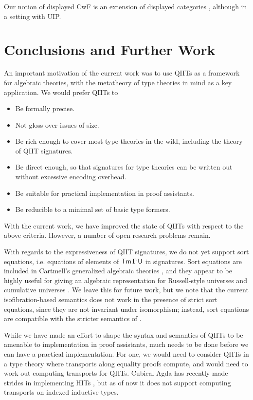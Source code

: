 \documentclass[sigplan,review,anonymous]{acmart}\settopmatter{printfolios=true,printccs=false,printacmref=false}
\begin{document}
Our notion of displayed CwF is an extension of displayed categories
\cite{displayedcats}, although in a setting with UIP.

\section{Conclusions and Further Work}
\label{sec:conclusion}

An important motivation of the current work was to use QIITs as a framework for
algebraic theories, with the metatheory of type theories in mind as a key
application. We would prefer QIITs to
\begin{itemize}
\item Be formally precise.
\item Not gloss over issues of size.
\item Be rich enough to cover most type theories in the wild, including the theory
      of QIIT signatures.
\item Be direct enough, so that signatures for type theories can
      be written out without excessive encoding overhead.
\item Be suitable for practical implementation in proof assistants.
\item Be reducible to a minimal set of basic type formers.
\end{itemize}

With the current work, we have improved the state of QIITs with respect to
the above criteria. However, a number of open research problems remain.

With regards to the expressiveness of QIIT signatures, we do not yet
support sort equations, i.e. equations of elements of $\mathsf{Tm}\,\Gamma\,\mathsf{U}$ in
signatures. Sort equations are included in Cartmell's generalized algebraic
theories \cite{gat}, and they appear to be highly useful for giving an algebraic
representation for Russell-style universes and cumulative universes
\cite{sterling2019algebraic}. We leave this for future work, but we note that
the current isofibration-based semantics does not work in the presence of strict
sort equations, since they are not invariant under isomorphism; instead, sort
equations are compatible with the stricter semantics of
\cite{kaposi2019constructing}.

While we have made an effort to shape the syntax and semantics of QIITs to
be amenable to implementation in proof assistants, much needs to be done before
we can have a practical implementation. For one, we would need to consider QIITs
in a type theory where transports along equality proofs compute, and would need
to work out computing transports for QIITs. Cubical Agda has recently made
strides in implementing HITs \cite{vezzosicubical}, but as of now it does not
support computing transports on indexed inductive types.
\end{document}

